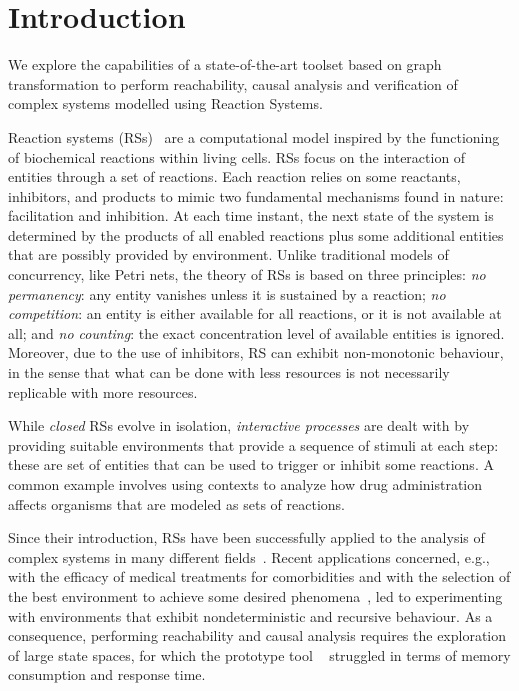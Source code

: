 
\section{Introduction}

We explore the capabilities of a state-of-the-art toolset based on graph transformation to perform reachability, causal analysis and verification of complex systems modelled using Reaction Systems.

Reaction systems (RSs)~\cite{DBLP:journals/fuin/EhrenfeuchtR07} are a computational model inspired by the functioning of biochemical reactions within living cells. 
RSs focus on the interaction of entities through a set of reactions. 
Each reaction relies on some reactants, inhibitors, and products to mimic two fundamental mechanisms found in nature: facilitation and inhibition.
At each time instant, the next state of the system is determined by the products of all enabled reactions plus some additional entities that are possibly provided by environment.
Unlike traditional models of concurrency, like Petri nets, the theory of RSs is based on three principles: \emph{no permanency}: any entity vanishes unless it is sustained by a reaction; \emph{no competition}: an entity is either available for all reactions, or it is not available at all; and \emph{no counting}: the exact concentration level of available entities is ignored.
Moreover, due to the use of inhibitors, RS can exhibit non-monotonic behaviour, in the sense that what can be done with less resources is not necessarily replicable with more resources.

While \emph{closed} RSs evolve in isolation, \emph{interactive processes} are dealt with by providing suitable environments that provide a sequence of stimuli at each step: these are set of entities that can be used to trigger or inhibit some reactions. A common example involves using contexts to analyze how drug administration affects organisms that are modeled as sets of reactions.

Since their introduction, RSs have been successfully applied to the analysis of complex systems in many different fields~\cite{ABP14,CMMBM12,Az17,OY16,DBLP:journals/ijfcs/EhrenfeuchtMR10,DBLP:journals/ijfcs/EhrenfeuchtMR11}.
Recent applications concerned, e.g., with the efficacy of medical treatments for comorbidities and with the selection of the best environment to achieve some desired phenomena~\cite{DBLP:conf/cmsb/BowlesBBFGM24,datamod2023}, led to experimenting with environments that exhibit nondeterministic and recursive behaviour.
As a consequence, performing reachability and causal analysis requires the exploration of large state spaces, for which the prototype tool \BioResolve~\cite{DBLP:journals/tcs/BrodoBF21} struggled in terms of  memory consumption and response time.
 

